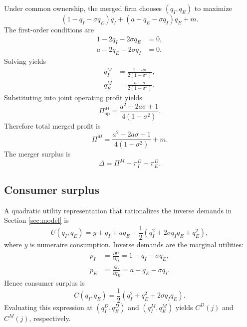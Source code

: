 Under common ownership, the merged firm chooses \((q_I,q_E)\) to maximize
\begin{equation}
    (1-q_I-\sigma q_E)q_I + (a-q_E-\sigma q_I)q_E + m.
\end{equation}
The first-order conditions are
\begin{align}
    1-2q_I-2\sigma q_E &= 0, \\
    a-2q_E-2\sigma q_I &= 0.
\end{align}
Solving yields
\begin{align}
    q_I^M &= \frac{1-a\sigma}{2(1-\sigma^2)}, \\
    q_E^M &= \frac{a-\sigma}{2(1-\sigma^2)}.
\end{align}
Substituting into joint operating profit yields
\begin{equation}
    \Pi_{\mathrm{op}}^M
    =
    \frac{a^2-2a\sigma+1}{4(1-\sigma^2)}.
\end{equation}
Therefore total merged profit is
\begin{equation}
    \Pi^M
    =
    \frac{a^2-2a\sigma+1}{4(1-\sigma^2)} + m.
\end{equation}
The merger surplus is
\begin{equation}
    \Delta
    =
    \Pi^M-\pi_I^D-\pi_E^D.
\end{equation}

\subsection{Consumer surplus}

A quadratic utility representation that rationalizes the inverse demands in Section \ref{sec:model} is
\begin{equation}
    U(q_I,q_E)
    =
    y + q_I + a q_E
    - \frac{1}{2}
      \left(
        q_I^2 + 2\sigma q_I q_E + q_E^2
      \right),
\end{equation}
where \(y\) is numeraire consumption.
Inverse demands are the marginal utilities:
\begin{align}
    p_I &= \frac{\partial U}{\partial q_I}
    = 1-q_I-\sigma q_E, \\
    p_E &= \frac{\partial U}{\partial q_E}
    = a-q_E-\sigma q_I.
\end{align}
Hence consumer surplus is
\begin{equation}
    C(q_I,q_E)
    =
    \frac{1}{2}
    \left(
        q_I^2 + q_E^2 + 2\sigma q_I q_E
    \right).
\end{equation}
Evaluating this expression at \((q_I^D,q_E^D)\) and \((q_I^M,q_E^M)\) yields \(C^D(j)\) and \(C^M(j)\), respectively.

